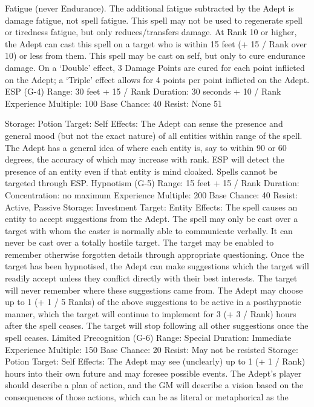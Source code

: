 \documentclass[a4paper]{article}
\begin{document}
\begin{multicols}{3}
Fatigue (never Endurance). The additional fatigue
subtracted by the Adept is damage fatigue, not
spell fatigue. This spell may not be used to regenerate spell or tiredness fatigue, but only reduces/transfers damage. At Rank 10 or higher, the
Adept can cast this spell on a target who is within
15 feet (+ 15 / Rank over 10) or less from them.
This spell may be cast on self, but only to cure
endurance damage. On a ‘Double’ effect, 3 Damage Points are cured for each point inflicted on the
Adept; a ‘Triple’ effect allows for 4 points per
point inflicted on the Adept.
ESP (G-4)
Range: 30 feet + 15 / Rank
Duration: 30 seconds + 10 / Rank
Experience Multiple: 100
Base Chance: 40%
Resist: None
51

Storage: Potion
Target: Self
Effects: The Adept can sense the presence and
general mood (but not the exact nature) of all entities within range of the spell. The Adept has a
general idea of where each entity is, say to within
90 or 60 degrees, the accuracy of which may increase with rank. ESP will detect the presence of
an entity even if that entity is mind cloaked. Spells
cannot be targeted through ESP.
Hypnotism (G-5)
Range: 15 feet + 15 / Rank
Duration: Concentration: no maximum
Experience Multiple: 200
Base Chance: 40%
Resist: Active, Passive
Storage: Investment
Target: Entity
Effects: The spell causes an entity to accept suggestions from the Adept. The spell may only be
cast over a target with whom the caster is normally
able to communicate verbally. It can never be cast
over a totally hostile target. The target may be
enabled to remember otherwise forgotten details
through appropriate questioning.
Once the target has been hypnotised, the Adept can
make suggestions which the target will readily
accept unless they conflict directly with their best
interests. The target will never remember where
these suggestions came from.
The Adept may choose up to 1 (+ 1 / 5 Ranks) of
the above suggestions to be active in a posthypnotic manner, which the target will continue to
implement for 3 (+ 3 / Rank) hours after the spell
ceases. The target will stop following all other
suggestions once the spell ceases.
Limited Precognition (G-6)
Range: Special
Duration: Immediate
Experience Multiple: 150
Base Chance: 20%
Resist: May not be resisted
Storage: Potion
Target: Self
Effects: The Adept may see (unclearly) up to 1 (+ 1
/ Rank) hours into their own future and may foresee possible events. The Adept’s player should
describe a plan of action, and the GM will describe
a vision based on the consequences of those actions, which can be as literal or metaphorical as the

\end{multicols}
\end{document}
